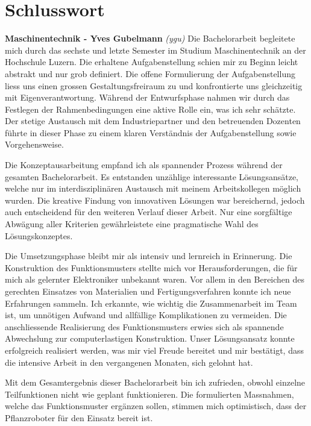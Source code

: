 \newpage
\section{Schlusswort}

\textbf{Maschinentechnik - Yves Gubelmann}
\newline
\textit{(ygu)} Die Bachelorarbeit begleitete mich durch das sechste und letzte Semester im Studium Maschinentechnik an der Hochschule Luzern. Die erhaltene Aufgabenstellung schien mir zu Beginn leicht abstrakt und nur grob definiert. Die offene Formulierung der Aufgabenstellung liess uns einen grossen Gestaltungsfreiraum  zu und konfrontierte uns gleichzeitig mit Eigenverantwortung. Während der Entwurfsphase nahmen wir durch das Festlegen der Rahmenbedingungen eine aktive Rolle ein, was ich sehr schätzte. Der stetige Austausch mit dem Industriepartner und den betreuenden Dozenten führte in dieser Phase zu einem klaren Verständnis der Aufgabenstellung sowie Vorgehensweise.
\newline

Die Konzeptausarbeitung empfand ich als spannender Prozess während der gesamten Bachelorarbeit. Es entstanden unzählige interessante Lösungsansätze, welche nur im interdisziplinären Austausch mit meinem Arbeitskollegen möglich wurden. Die kreative Findung von innovativen Lösungen war bereichernd, jedoch auch entscheidend für den weiteren Verlauf dieser Arbeit. Nur eine sorgfältige Abwägung aller Kriterien gewährleistete eine pragmatische Wahl des Lösungskonzeptes.
\newline

Die Umsetzungsphase bleibt mir als intensiv und lernreich in Erinnerung. Die Konstruktion des Funktionsmusters stellte mich vor Herausforderungen, die für mich als gelernter Elektroniker unbekannt waren. Vor allem in den Bereichen des gerechten Einsatzes von Materialien und Fertigungsverfahren konnte ich neue Erfahrungen sammeln. Ich erkannte, wie wichtig die Zusammenarbeit im Team ist, um unnötigen Aufwand und allfällige Komplikationen zu vermeiden. Die anschliessende Realisierung des Funktionsmusters erwies sich als spannende Abwechslung zur computerlastigen Konstruktion. Unser Lösungsansatz konnte erfolgreich realisiert werden, was mir viel Freude bereitet und mir bestätigt, dass die intensive Arbeit in den vergangenen Monaten, sich gelohnt hat.
\newline

Mit dem Gesamtergebnis dieser Bachelorarbeit bin ich zufrieden, obwohl einzelne Teilfunktionen nicht wie geplant funktionieren. Die formulierten Massnahmen, welche das Funktionsmuster ergänzen sollen, stimmen mich optimistisch, dass der Pflanzroboter für den Einsatz bereit ist.
\newline

